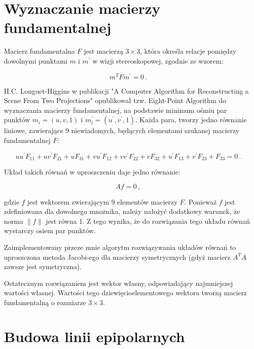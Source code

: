 \section{Wyznaczanie macierzy fundamentalnej}

Macierz fundamentalna $F$ jest macierzą $3 \times 3$, która określa relacje
pomiędzy dowolnymi punktami $m$ i $m^\prime$ w wizji stereoskopowej, zgodnie ze
wzorem: 

\begin{equation}
  m^TFm^\prime = 0\,.
\end{equation}

H.C. Longuet-Higgins w publikacji "A Computer Algorithm for Reconstructing a
Scene From Two Projections" \cite{eight_point} opublikował tzw.  Eight-Point
Algorithm do wyznaczania macierzy fundamentalnej, na podstawie minimum ośmiu
par punktów $m_i=(u,v,1)$ i $m_i^\prime=(u^\prime,v^\prime,1)$.  Każda para,
tworzy jedno równanie liniowe, zawierające 9 niewiadomych, będących elementami
szukanej macierzy fundamentalnej $F$: 

\begin{equation} uu^\prime F_{11} + uv^\prime F_{21} + uF_{31} + vu^\prime
  F_{12} + vv^\prime F_{22} + vF_{32} + u^\prime F_{13} + v^\prime F_{23} +
  F_{33} = 0\,.  \end{equation}

Układ takich równań w uproszczeniu daje jedno równanie: 

\begin{equation} Af=0\,, \end{equation}

gdzie $f$ jest wektorem zwierającym 9 elementów macierzy $F$. Ponieważ $f$ jest
zdefiniowana dla dowolnego mnożnika, należy nałożyć dodatkowy warunek, że norma
$\|f\|$ jest równa 1. Z tego wynika, że do rozwiązania tego układu równań
wystarczy osiem par punktów.

Zaimplementowany przeze mnie algorytm rozwiązywania układów równań to
uproszczona metoda Jacobi-ego dla macierzy symetrycznych (gdyż macierz $A^TA$
zawsze jest symetryczna).

Ostatecznym rozwiązaniem jest wektor własny, odpowiadający najmniejszej
wartości własnej.  Wartości tego dziewięcioelementowego wektora tworzą macierz
fundamentalną o rozmiarze $3 \times 3$.

\section{Budowa linii epipolarnych}

